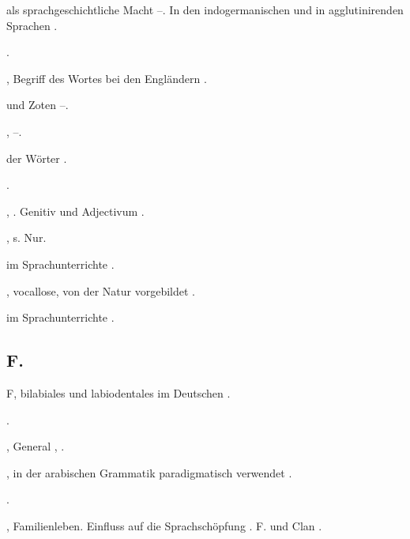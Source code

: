 \begin{register}
 als sprachgeschichtliche Macht \pageref{sp.215}–\pageref{sp.218}. In den indogermanischen und in agglutinirenden Sprachen \pageref{sp.403}.

 \pageref{sp.404}.

, Begriff des Wortes bei den Engländern \pageref{sp.179}.

 und Zoten \pageref{sp.248}–\pageref{sp.249}.

,  \pageref{sp.196}–\pageref{sp.205}.

 der Wörter \pageref{sp.157}.

 \pageref{sp.216}.

 \pageref{sp.150}, \pageref{sp.282}. Genitiv und Adjectivum \pageref{sp.455}.

, s. Nur.

 im Sprachunterrichte \pageref{sp.72}.

, vocallose, von der Natur vorgebildet \pageref{sp.314}.

 im Sprachunterrichte \pageref{sp.72}.


\subsection*{F.}\label{reg.F}

F, bilabiales und labiodentales im Deutschen \pageref{sp.188}.


 \pageref{sp.102}.


, General \pageref{sp.32}, \pageref{sp.69}.

, in der arabischen Grammatik paradigmatisch verwendet \pageref{sp.117}.

 \pageref{sp.282}.

, Familienleben. Einfluss auf die Sprachschöpfung \pageref{sp.306}. F. und Clan \pageref{sp.307}.



\end{register}

